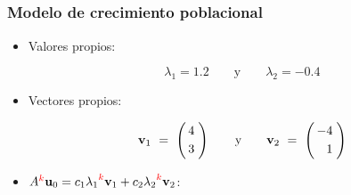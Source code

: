 
\subsection{}

\begin{frame}\frametitle{Modelo de crecimiento poblacional}
	
	
	\begin{itemize}
		
		\vspace{2mm}		
		\item Valores propios:
		
		\[	
			\lambda_1 = 1.2 \qquad \text{y} \qquad \lambda_2 = -0.4
		\]
		
		\vspace{6mm}
		\item Vectores propios:
		
		\vspace{1mm}
		\[	
		\mathbf{v}_1
		\ = \	
		\left(
		\begin{array}{@{\hspace{0.3\tabcolsep}}c@{\hspace{0.5\tabcolsep}}}
		4   \\[1mm]
		3 
		\end{array}
		\right) 
		\qquad \text{y} \qquad
		\mathbf{v}_2
		\ = \	
		\left(
		\begin{array}{@{\hspace{0.3\tabcolsep}}r@{\hspace{0.5\tabcolsep}}}
		-4   \\[1mm]
		1 
		\end{array}
		\right) 
		\]
		
		\vspace{6mm}
		\item $A^{\color{red}k}\mathbf{u}_0 = c_1{\lambda_1}^{\color{red}k}\mathbf{v}_1 + c_2{\lambda_2}^{\color{red}k}\mathbf{v}_2$:
		

\end{itemize}
\end{frame}
